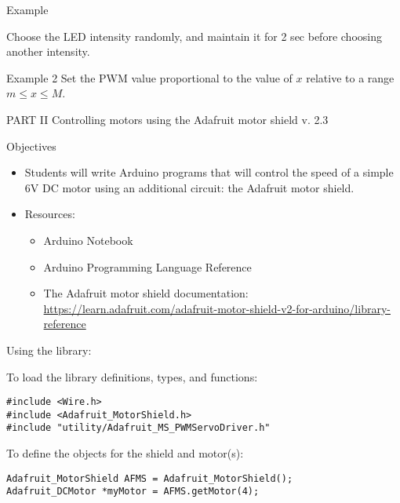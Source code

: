 \documentclass[aspectratio=1610]{beamer}
\begin{document}

\begin{frame}[plain,t]{Example}

Choose the LED intensity  randomly, and maintain it for 2 sec before
choosing another intensity.
\end{frame}



\begin{frame}[plain,t]{Example 2}
Set the PWM value proportional to the value of $x$ relative to a range
$m \le x \le M$.
\end{frame}



\begin{frame}[plain]{PART II}
{\large Controlling motors using the Adafruit motor shield v. 2.3}
\end{frame}



\begin{frame}[t,plain]{Objectives}
\begin{itemize}
\item Students will write Arduino
  programs that will control the speed of a simple 6V DC motor using
  an additional circuit: the Adafruit motor shield.
\item  Resources: 
\begin{itemize}
\item Arduino Notebook 
\item Arduino Programming Language
  Reference
\item The Adafruit motor shield documentation: 
\url{https://learn.adafruit.com/adafruit-motor-shield-v2-for-arduino/library-reference}
\end{itemize}
\end{itemize}
\end{frame}


\begin{frame}{Using the library:}

To load the library definitions, types, and functions:

\begin{semiverbatim}
\begin{lstlisting}
#include <Wire.h>
#include <Adafruit_MotorShield.h>
#include "utility/Adafruit_MS_PWMServoDriver.h"
\end{lstlisting}
\end{semiverbatim}


\medskip

To define the objects for the shield and motor(s):

\begin{semiverbatim}
\begin{lstlisting}
Adafruit_MotorShield AFMS = Adafruit_MotorShield(); 
Adafruit_DCMotor *myMotor = AFMS.getMotor(4);
\end{lstlisting}
\end{semiverbatim}
\end{frame}
\end{document}
